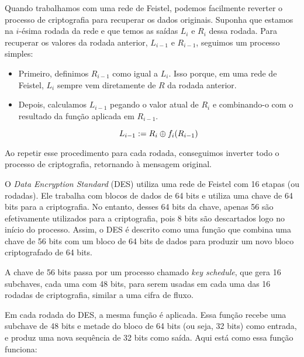 Quando trabalhamos com uma rede de Feistel, podemos facilmente reverter o processo de criptografia para recuperar os dados originais.
Suponha que estamos na $i$-ésima rodada da rede e que temos as saídas $L_i$ e $R_i$ dessa rodada.
Para recuperar os valores da rodada anterior, $L_{i-1}$ e $R_{i-1}$, seguimos um processo simples:

\begin{itemize}
\item Primeiro, definimos $R_{i-1}$ como igual a $L_i$.
  Isso porque, em uma rede de Feistel, $L_i$ sempre vem diretamente de $R$ da rodada anterior.
\item Depois, calculamos $L_{i-1}$ pegando o valor atual de $R_i$ e combinando-o com o resultado da função aplicada em $R_{i-1}$.

  \begin{displaymath}
    L_{i-1} := R_i \oplus f_i(R_{i-1})
  \end{displaymath}
\end{itemize}

Ao repetir esse procedimento para cada rodada, conseguimos inverter todo o processo de criptografia, retornando à mensagem original.

O \textit{Data Encryption Standard} (DES) utiliza uma rede de Feistel com 16 etapas (ou rodadas).
Ele trabalha com blocos de dados de 64 bits e utiliza uma chave de 64 bits para a criptografia.
No entanto, desses 64 bits da chave, apenas 56 são efetivamente utilizados para a criptografia, pois 8 bits são descartados logo no início do processo.
Assim, o DES é descrito como uma função que combina uma chave de 56 bits com um bloco de 64 bits de dados para produzir um novo bloco criptografado de 64 bits.

A chave de 56 bits passa por um processo chamado \textit{key schedule}, que gera 16 subchaves, cada uma com 48 bits, para serem usadas em cada uma das 16 rodadas de criptografia, similar a uma cifra de fluxo.

Em cada rodada do DES, a mesma função é aplicada.
Essa função recebe uma subchave de 48 bits e metade do bloco de 64 bits (ou seja, 32 bits) como entrada, e produz uma nova sequência de 32 bits como saída.
Aqui está como essa função funciona:

